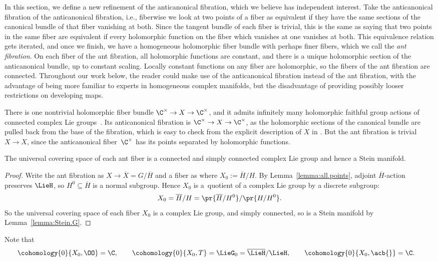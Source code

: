 In this section, we define a new refinement of the anticanonical fibration, which we believe has independent interest.
Take the anticanonical fibration of the anticanonical fibration, i.e., fiberwise we look at two points of a fiber as equivalent if they have the same sections of the canonical bundle of that fiber vanishing at both.
Since the tangent bundle of each fiber is trivial, this is the same as saying that two points in the same fiber are equivalent if every holomorphic function on the fiber which vanishes at one vanishes at both.
This equivalence relation gets iterated, and once we finish, we have a homogeneous holomorphic fiber bundle with perhaps finer fibers, which we call the \emph{ant fibration}.
On each fiber of the ant fibration, all holomorphic functions are constant, and there is a unique holomorphic section of the anticanonical bundle, up to constant scaling.
Locally constant functions on any fiber are holomorphic, so the fibers of the ant fibration are connected.
Throughout our work below, the reader could make use of the anticanonical fibration instead of the ant fibration, with the advantage of being more familiar to experts in homogeneous complex manifolds, but the disadvantage of providing possibly looser restrictions on developing maps.

\begin{Example}
There is one nontrivial holomorphic fiber bundle $\C^{\times} \to X \to \C^{\times}$, and it admits
infinitely many holomorphic faithful group actions of connected complex Lie groups~\cite{McKay:2015}. Its
anticanonical fibration is $\C^{\times} \to X \to \C^{\times}$, as the holomorphic sections of the
canonical bundle are pulled back from the base of the fibration, which is easy to check from the explicit
description of $X$ in \cite{McKay:2015}. But the ant fibration is trivial $X \to X$, since the
anticanonical fiber~$\C^{\times}$ has its points separated by holomorphic functions.
\end{Example}

\begin{Lemma}\label{lemma:ant.Stein}
The universal covering space of each ant fiber is a connected and simply connected complex Lie group and hence a Stein manifold.
\end{Lemma}

\begin{proof}
Write the ant fibration as $X\to \overline{X} = G/\overline{H}$ and a fiber as  where $X_0 := \overline{H}/H$.
By Lemma~\ref{lemma:all.points}, adjoint $\overline{H}$-action preserves $\LieH$, so $H^0 \subseteq \overline{H}$ is a normal subgroup.
Hence $X_0$ is a~quotient of a complex Lie group by a discrete subgroup:
\[
X_0 = \overline{H}/H = \pr{\overline{H}/H^0}/\pr{H/H^0}.
\]
So the universal covering space of each fiber $X_0$ is a complex Lie group, and simply connected, so is a Stein manifold by Lemma~\ref{lemma:Stein.G}.
\end{proof}
Note that
\begin{align*}
&\cohomology{0}{X_0,\OO}=\C,\qquad
\cohomology{0}{X_0,T}=\LieG_0=\overline{\LieH}/\LieH,\qquad
\cohomology{0}{X_0,\acb{}}=\C.
\end{align*}

